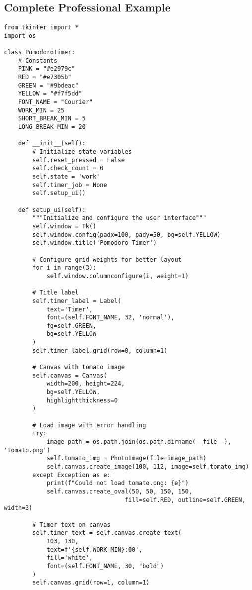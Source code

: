 \documentclass[12pt,a4paper]{article}
\begin{document}
\subsection{Complete Professional Example}

\begin{tcolorbox}[colback=gray!5!white,colframe=gray!75!black,title=Complete Professional Pomodoro Timer]
\begin{lstlisting}
from tkinter import *
import os

class PomodoroTimer:
    # Constants
    PINK = "#e2979c"
    RED = "#e7305b"
    GREEN = "#9bdeac"
    YELLOW = "#f7f5dd"
    FONT_NAME = "Courier"
    WORK_MIN = 25
    SHORT_BREAK_MIN = 5
    LONG_BREAK_MIN = 20
    
    def __init__(self):
        # Initialize state variables
        self.reset_pressed = False
        self.check_count = 0
        self.state = 'work'
        self.timer_job = None
        self.setup_ui()
    
    def setup_ui(self):
        """Initialize and configure the user interface"""
        self.window = Tk()
        self.window.config(padx=100, pady=50, bg=self.YELLOW)
        self.window.title('Pomodoro Timer')
        
        # Configure grid weights for better layout
        for i in range(3):
            self.window.columnconfigure(i, weight=1)
        
        # Title label
        self.timer_label = Label(
            text='Timer', 
            font=(self.FONT_NAME, 32, 'normal'),
            fg=self.GREEN, 
            bg=self.YELLOW
        )
        self.timer_label.grid(row=0, column=1)
        
        # Canvas with tomato image
        self.canvas = Canvas(
            width=200, height=224, 
            bg=self.YELLOW, 
            highlightthickness=0
        )
        
        # Load image with error handling
        try:
            image_path = os.path.join(os.path.dirname(__file__), 'tomato.png')
            self.tomato_img = PhotoImage(file=image_path)
            self.canvas.create_image(100, 112, image=self.tomato_img)
        except Exception as e:
            print(f"Could not load tomato.png: {e}")
            self.canvas.create_oval(50, 50, 150, 150, 
                                  fill=self.RED, outline=self.GREEN, width=3)
        
        # Timer text on canvas
        self.timer_text = self.canvas.create_text(
            103, 130, 
            text=f'{self.WORK_MIN}:00', 
            fill='white', 
            font=(self.FONT_NAME, 30, "bold")
        )
        self.canvas.grid(row=1, column=1)
        

\end{lstlisting}
\end{tcolorbox}
\end{document}
